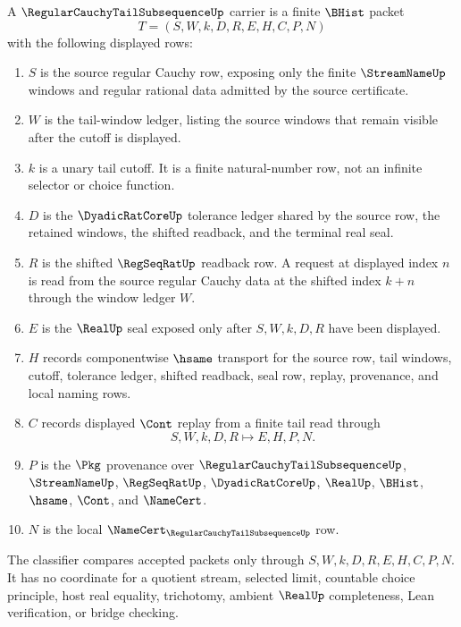 \begin{definition}
\label{def:regular-cauchy-tail-subsequence-carrier}
A $\RegularCauchyTailSubsequenceUp$ carrier is a finite $\BHist$ packet
$$
T=(S,W,k,D,R,E,H,C,P,N)
$$
with the following displayed rows:
\begin{enumerate}
\item $S$ is the source regular Cauchy row, exposing only the finite $\StreamNameUp$ windows and regular rational data admitted by the source certificate.
\item $W$ is the tail-window ledger, listing the source windows that remain visible after the cutoff is displayed.
\item $k$ is a unary tail cutoff. It is a finite natural-number row, not an infinite selector or choice function.
\item $D$ is the $\DyadicRatCoreUp$ tolerance ledger shared by the source row, the retained windows, the shifted readback, and the terminal real seal.
\item $R$ is the shifted $\RegSeqRatUp$ readback row. A request at displayed index $n$ is read from the source regular Cauchy data at the shifted index $k+n$ through the window ledger $W$.
\item $E$ is the $\RealUp$ seal exposed only after $S,W,k,D,R$ have been displayed.
\item $H$ records componentwise $\hsame$ transport for the source row, tail windows, cutoff, tolerance ledger, shifted readback, seal row, replay, provenance, and local naming rows.
\item $C$ records displayed $\Cont$ replay from a finite tail read through
$$
S,W,k,D,R \longmapsto E,H,P,N .
$$
\item $P$ is the $\Pkg$ provenance over $\RegularCauchyTailSubsequenceUp$, $\StreamNameUp$, $\RegSeqRatUp$, $\DyadicRatCoreUp$, $\RealUp$, $\BHist$, $\hsame$, $\Cont$, and $\NameCert$.
\item $N$ is the local $\NameCert_{\RegularCauchyTailSubsequenceUp}$ row.
\end{enumerate}
The classifier compares accepted packets only through $S,W,k,D,R,E,H,C,P,N$. It has no coordinate for a quotient stream, selected limit, countable choice principle, host real equality, trichotomy, ambient $\RealUp$ completeness, Lean verification, or bridge checking.
\end{definition}

